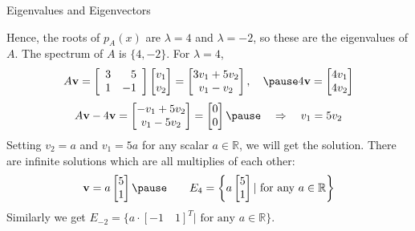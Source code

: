 \documentclass{beamer}
\newcommand{\vv}{\mathbf{v}}
\newcommand{\R}{\mathbb{R}}
\begin{document}
\begin{frame}{Eigenvalues and Eigenvectors}


\begin{example}
Hence, the roots of $p_{A}(x)$ are $\lambda = 4$ and $\lambda = -2$, so these are the eigenvalues of $A$. The spectrum of $A$ is $\{4,-2\}$. \pause For $\lambda=4$,
\[ A\vv =  \left[ \begin{array}{rr} 3 & 5 \\ 1 & -1 \end{array}\right] \begin{bmatrix}
    v_1\\v_2
\end{bmatrix} =\begin{bmatrix}
    3v_1+5v_2 \\ v_1 - v_2
\end{bmatrix}, \quad \pause 4\vv = \begin{bmatrix}
    4v_1 \\ 4v_2
\end{bmatrix}
\]
\[ A\vv-4\vv =\begin{bmatrix}
    -v_1+5v_2 \\ v_1 -5v_2
\end{bmatrix} =\begin{bmatrix}
    0\\0
\end{bmatrix}\pause\quad\Rightarrow\quad v_1=5v_2
\]
\pause Setting $v_2=a$ and $v_1=5a$ for any scalar $a\in\R$, we will get the solution. There are infinite solutions which are all multiplies of each other:
\[ \vv = a \begin{bmatrix}
    5\\1
\end{bmatrix} \pause \qquad E_4 = \bigg\{ a \begin{bmatrix}
    5\\1
\end{bmatrix} \vert \text{ for any } a \in \R\bigg\} \]
\pause Similarly we get $E_{-2} = \{ a\cdot [-1\quad 1]^T \vert \text{ for any } a \in \R\} $.
\end{example}


\end{frame}
\end{document}
